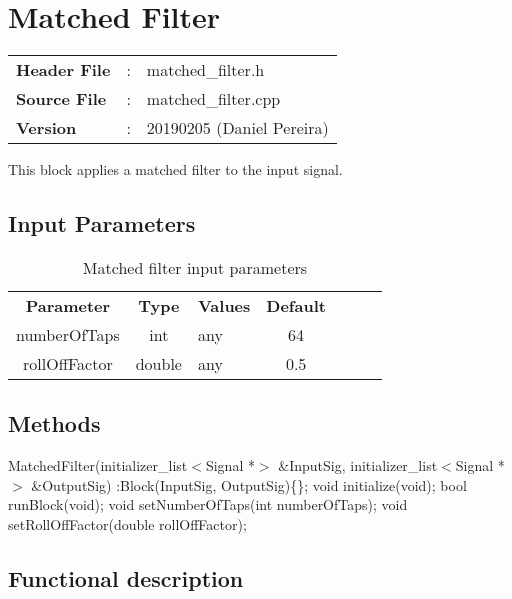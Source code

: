 \clearpage

\section{Matched Filter}

\begin{tcolorbox}	
	\begin{tabular}{p{2.75cm} p{0.2cm} p{10.5cm}} 	
		\textbf{Header File}   &:& matched\_filter.h \\
		\textbf{Source File}   &:& matched\_filter.cpp \\
        \textbf{Version}       &:& 20190205 (Daniel Pereira)\\
	\end{tabular}
\end{tcolorbox}

This block applies a matched filter to the input signal.

\subsection*{Input Parameters}

\begin{table}[h]
	\centering
	\begin{tabular}{|c|c|p{60mm}|c|ccc}
		\cline{1-4}
		\textbf{Parameter} & \textbf{Type}   & \textbf{Values} & \textbf{Default} \\ \cline{1-4}
		numberOfTaps       & int             & any             & 64               \\ \cline{1-4}
		rollOffFactor      & double          & any             & 0.5              \\ \cline{1-4}
	\end{tabular}
	\caption{Matched filter input parameters} 
	\label{table:MatchedFilter_in_par}
\end{table}

\subsection*{Methods}

\bigbreak
MatchedFilter(initializer\_list$<$Signal *$>$ \&InputSig, initializer\_list$<$Signal *$>$ \&OutputSig) :Block(InputSig, OutputSig)\{\};
\bigbreak
void initialize(void);
\bigbreak
bool runBlock(void);
\bigbreak
void setNumberOfTaps(int numberOfTaps);
\bigbreak
void setRollOffFactor(double rollOffFactor);

\subsection*{Functional description}


